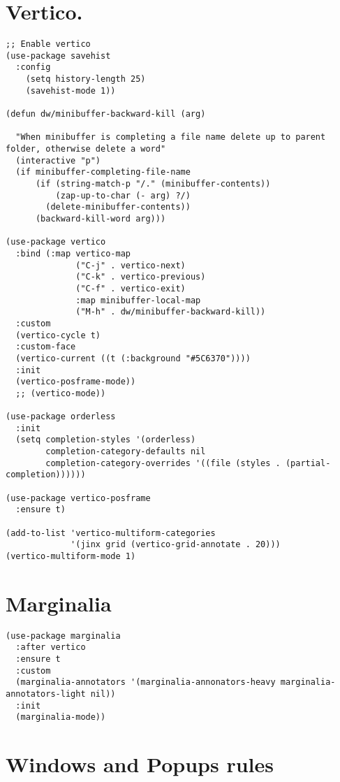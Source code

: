 \documentclass[11pt]{article}
\begin{document}
\section{Vertico.}
\label{sec:org0e56c01}
\begin{verbatim}
;; Enable vertico
(use-package savehist
  :config
    (setq history-length 25)
    (savehist-mode 1))

(defun dw/minibuffer-backward-kill (arg)

  "When minibuffer is completing a file name delete up to parent
folder, otherwise delete a word"
  (interactive "p")
  (if minibuffer-completing-file-name
      (if (string-match-p "/." (minibuffer-contents))
          (zap-up-to-char (- arg) ?/)
        (delete-minibuffer-contents))
      (backward-kill-word arg)))

(use-package vertico
  :bind (:map vertico-map
              ("C-j" . vertico-next)
              ("C-k" . vertico-previous)
              ("C-f" . vertico-exit)
              :map minibuffer-local-map
              ("M-h" . dw/minibuffer-backward-kill))
  :custom
  (vertico-cycle t)
  :custom-face
  (vertico-current ((t (:background "#5C6370"))))
  :init
  (vertico-posframe-mode))
  ;; (vertico-mode))

(use-package orderless
  :init
  (setq completion-styles '(orderless)
        completion-category-defaults nil
        completion-category-overrides '((file (styles . (partial-completion))))))

(use-package vertico-posframe
  :ensure t)

(add-to-list 'vertico-multiform-categories
             '(jinx grid (vertico-grid-annotate . 20)))
(vertico-multiform-mode 1)
\end{verbatim}
\section{Marginalia}
\label{sec:org13f1c5b}
\begin{verbatim}
(use-package marginalia
  :after vertico
  :ensure t
  :custom
  (marginalia-annotators '(marginalia-annonators-heavy marginalia-annotators-light nil))
  :init
  (marginalia-mode))
\end{verbatim}
\section{Windows and Popups rules}
\label{sec:org4fc08bf}
\end{document}
